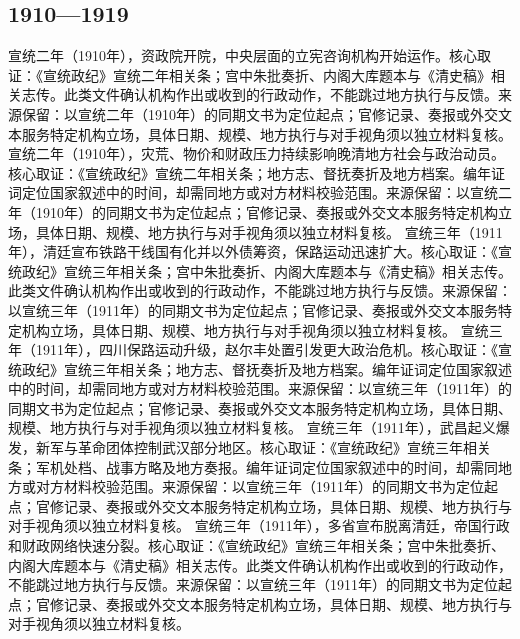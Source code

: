 \subsection{1910—1919}
宣统二年（1910年），资政院开院，中央层面的立宪咨询机构开始运作。核心取证：《宣统政纪》宣统二年相关条；宫中朱批奏折、内阁大库题本与《清史稿》相关志传。此类文件确认机构作出或收到的行政动作，不能跳过地方执行与反馈。来源保留：以宣统二年（1910年）的同期文书为定位起点；官修记录、奏报或外交文本服务特定机构立场，具体日期、规模、地方执行与对手视角须以独立材料复核。
宣统二年（1910年），灾荒、物价和财政压力持续影响晚清地方社会与政治动员。核心取证：《宣统政纪》宣统二年相关条；地方志、督抚奏折及地方档案。编年证词定位国家叙述中的时间，却需同地方或对方材料校验范围。来源保留：以宣统二年（1910年）的同期文书为定位起点；官修记录、奏报或外交文本服务特定机构立场，具体日期、规模、地方执行与对手视角须以独立材料复核。
宣统三年（1911年），清廷宣布铁路干线国有化并以外债筹资，保路运动迅速扩大。核心取证：《宣统政纪》宣统三年相关条；宫中朱批奏折、内阁大库题本与《清史稿》相关志传。此类文件确认机构作出或收到的行政动作，不能跳过地方执行与反馈。来源保留：以宣统三年（1911年）的同期文书为定位起点；官修记录、奏报或外交文本服务特定机构立场，具体日期、规模、地方执行与对手视角须以独立材料复核。
宣统三年（1911年），四川保路运动升级，赵尔丰处置引发更大政治危机。核心取证：《宣统政纪》宣统三年相关条；地方志、督抚奏折及地方档案。编年证词定位国家叙述中的时间，却需同地方或对方材料校验范围。来源保留：以宣统三年（1911年）的同期文书为定位起点；官修记录、奏报或外交文本服务特定机构立场，具体日期、规模、地方执行与对手视角须以独立材料复核。
宣统三年（1911年），武昌起义爆发，新军与革命团体控制武汉部分地区。核心取证：《宣统政纪》宣统三年相关条；军机处档、战事方略及地方奏报。编年证词定位国家叙述中的时间，却需同地方或对方材料校验范围。来源保留：以宣统三年（1911年）的同期文书为定位起点；官修记录、奏报或外交文本服务特定机构立场，具体日期、规模、地方执行与对手视角须以独立材料复核。
宣统三年（1911年），多省宣布脱离清廷，帝国行政和财政网络快速分裂。核心取证：《宣统政纪》宣统三年相关条；宫中朱批奏折、内阁大库题本与《清史稿》相关志传。此类文件确认机构作出或收到的行政动作，不能跳过地方执行与反馈。来源保留：以宣统三年（1911年）的同期文书为定位起点；官修记录、奏报或外交文本服务特定机构立场，具体日期、规模、地方执行与对手视角须以独立材料复核。
